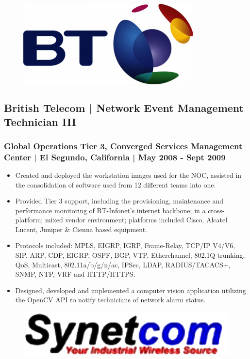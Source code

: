 \documentclass[letter,10pt]{article}
\begin{document}
\begin{figure}
\includegraphics[width=0.8\linewidth]{./img/50p_cr_bt.jpg}
\end{figure}

\subsection*{British Telecom | Network Event Management Technician III}
\label{sec:orgef1cfff}
\subsubsection*{Global Operations Tier 3, Converged Services Management Center | El Segundo, California | May 2008 - Sept 2009}
\label{sec:orgf32d902}
\begin{itemize}
\item Created and deployed the workstation images used for the NOC, assisted in the consolidation of software used from 12 different teams into one.
\item Provided Tier 3 support, including the provisioning, maintenance and performance monitoring of BT-Infonet’s internet backbone; in a cross-platform; mixed vendor environment; platforms included Cisco, Alcatel Lucent, Juniper \& Cienna based equipment.
\item Protocols included: MPLS, EIGRP, IGRP, Frame-Relay, TCP/IP V4/V6, SIP, ARP, CDP, EIGRP, OSPF, BGP, VTP, Etherchannel, 802.1Q trunking, QoS, Multicast, 802.11a/b/g/n/ac, IPSec, LDAP, RADIUS/TACACS+, SNMP, NTP, VRF and HTTP/HTTPS.
\item Designed, developed and implemented a computer vision application utilizing the OpenCV API to notify technicians of network alarm status.
\end{itemize}



\begin{figure}
\includegraphics[width=0.8\linewidth]{./img/50p_cr_synetcom.jpg}
\end{figure}
\end{document}
